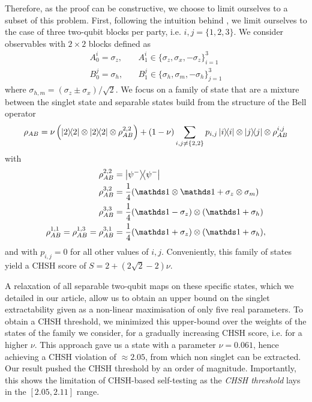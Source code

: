 Therefore, as the proof can be constructive, we choose to limit ourselves to a subset of this problem.
First, following the intuition behind \cite{Coopmans19}, we limit ourselves to the case of three two-qubit blocks per party, i.e. $i,j=\{1,2,3\}$.
We consider observables with $2 \times 2$ blocks defined as 
\begin{equation}
	\begin{split}
		A_0^i = \sigma_z, &\quad A_1^i \in \{\sigma_z,\sigma_x,-\sigma_z\}_{i=1}^3  \\
		B_0^j = \sigma_h, &\quad B_1^j \in \{\sigma_h,\sigma_m,-\sigma_h\}_{j=1}^3 
	\end{split}
\end{equation}
where $\sigma_{h,m} = (\sigma_z\pm\sigma_x)/\sqrt{2}$.
We focus on a family of state that are a mixture between the singlet state and separable states build from the structure of the Bell operator
\begin{equation}
	\rho_{AB} = \nu \left(\ketbra{2} \otimes \ketbra{2} \otimes \rho_{AB}^{2,2}\right) 
	+ (1-\nu) \sum_{i,j \neq \{2,2\}} p_{i,j} \ketbra{i} \otimes \ketbra{j} \otimes \rho_{AB}^{i,j}
\end{equation}
with 
\begin{equation}
	\begin{split}
    \rho_{AB}^{2,2}&=\ketbra{\psi^-} \\
    \rho_{AB}^{3,2}&= \frac{1}{4}(\id\otimes \id +\sigma_z\otimes \sigma_m)\\
    \rho_{AB}^{3,3}&= \frac{1}{4}(\id-\sigma_z)\otimes(\id+\sigma_h)\\
    \rho_{AB}^{1,1}=\rho_{AB}^{1,3}=\rho_{AB}^{3,1} &= \frac{1}{4}(\id+\sigma_z)\otimes(\id+\sigma_h),
	\end{split}	
\end{equation}
and with $p_{i,j} =0$ for all other values of $i,j$.
Conveniently, this family of states yield a CHSH score of $S=2+(2\sqrt{2}-2)\nu$.

A relaxation of all separable two-qubit maps on these specific states, which we detailed in our article, allow us to obtain an upper bound on the singlet extractability given as a non-linear maximisation of only five real parameters.
To obtain a CHSH threshold, we minimized this upper-bound over the weights of the states of the family we consider, for a gradually increasing CHSH score, i.e. for a higher $\nu$.
This approach gave us a state with a parameter $\nu=0.061$, hence achieving a CHSH violation of $\approx 2.05$, from which non singlet can be extracted.
Our result pushed the CHSH threshold by an order of magnitude.
Importantly, this shows the limitation of CHSH-based self-testing as the \textit{CHSH threshold} lays in the $[2.05,2.11]$ range.


